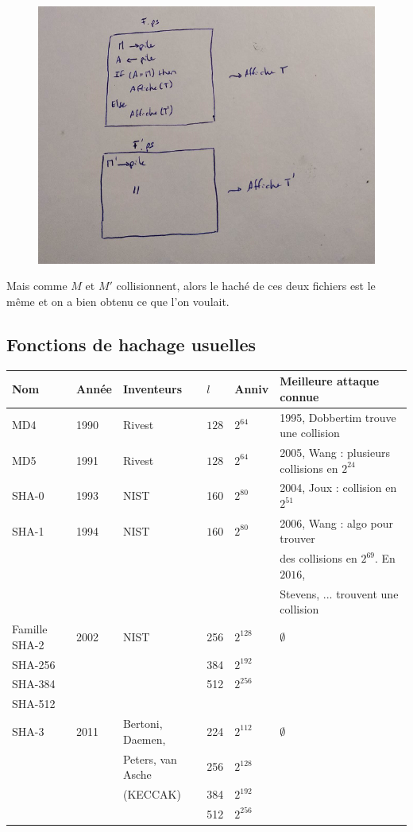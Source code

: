                 \begin{figure}[H]
                    \centering
                    \includegraphics[width=.7\textwidth]{pictures/07}
                \end{figure} \noindent
                
                Mais comme $M$ et $M'$ collisionnent, alors le haché de ces deux fichiers est le même et on a bien obtenu ce que l'on voulait.

        \subsection{Fonctions de hachage usuelles}
            \begin{tabularx}{\textwidth}{X|l|l|l|l|X}
                Nom & Année & Inventeurs & $l$ & Anniv & Meilleure attaque connue \\
                \hline
                MD4 & 1990 & Rivest & $128$ & $2^{64}$ & 1995, Dobbertim trouve une collision \\
                \hline
                MD5 & 1991 & Rivest & $128$ & $2^{64}$ & 2005, Wang : plusieurs collisions en $2^{24}$\\
                \hline
                SHA{\color{blue}-0} & 1993 & NIST & 160 & $2^{80}$ & 2004, Joux : collision en $2^{51}$ \\
                \hline
                SHA-1& 1994 & NIST & $160$ & $2^{80}$ & 2006, Wang : algo pour trouver \\
                &&&&& des collisions en $2^{69}$. En $2016$, \\
                &&&&& Stevens, ... trouvent une collision \\
                \hline
                {\color{blue} Famille SHA-2}& 2002 & NIST & 256 & $2^{128}$ & $\emptyset$ \\
                SHA-256 &&& 384 & $2^{192}$& \\
                SHA-384 &&& 512 & $2^{256}$& \\
                SHA-512 &&&&& \\
                \hline
                SHA-3 & 2011 & Bertoni, Daemen, & 224 & $2^{112}$ & $\emptyset$ \\
                && Peters, van Asche & 256 & $2^{128}$ &\\
                && (KECCAK) & 384 & $2^{192}$ &\\
                &&& 512 & $2^{256}$ &\\
            \end{tabularx}

